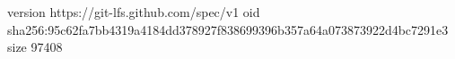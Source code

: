 version https://git-lfs.github.com/spec/v1
oid sha256:95c62fa7bb4319a4184dd378927f838699396b357a64a073873922d4bc7291e3
size 97408
